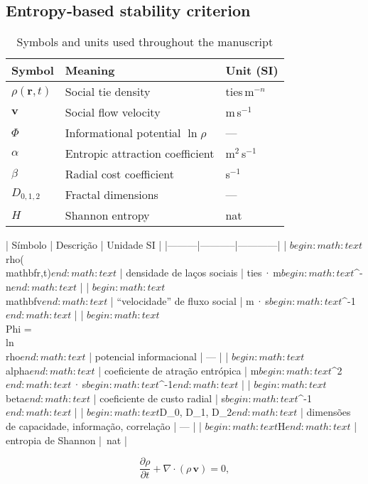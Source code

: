 \subsection{Entropy‑based stability criterion}\label{sec:entropy}
\begin{table}[h]
\caption{Symbols and units used throughout the manuscript}
\centering
\begin{tabular}{lll}
\hline
Symbol & Meaning & Unit (SI)\\\hline
$\rho(\mathbf{r},t)$ & Social tie density & ties\,m$^{-n}$\\
$\mathbf{v}$ & Social flow velocity & m\,s$^{-1}$\\
$\Phi$ & Informational potential $\ln\rho$ & —\\
$\alpha$ & Entropic attraction coefficient & m$^{2}$\,s$^{-1}$\\
$\beta$ & Radial cost coefficient & s$^{-1}$\\
$D_{0,1,2}$ & Fractal dimensions & —\\
$H$ & Shannon entropy & nat\\\hline
\end{tabular}
\label{tab:symbols}
\end{table}

| Símbolo | Descrição | Unidade SI |
|---------|-----------|------------|
| $begin:math:text$\\rho(\\mathbf{r},t)$end:math:text$ | densidade de laços sociais | ties · m$begin:math:text$^{-n}$end:math:text$ |
| $begin:math:text$\\mathbf{v}$end:math:text$ | “velocidade” de fluxo social | m · s$begin:math:text$^{-1}$end:math:text$ |
| $begin:math:text$\\Phi = \\ln \\rho$end:math:text$ | potencial informacional | — |
| $begin:math:text$\\alpha$end:math:text$ | coeficiente de atração entrópica | m$begin:math:text$^2$end:math:text$ · s$begin:math:text$^{-1}$end:math:text$ |
| $begin:math:text$\\beta$end:math:text$ | coeficiente de custo radial | s$begin:math:text$^{-1}$end:math:text$ |
| $begin:math:text$D_0, D_1, D_2$end:math:text$ | dimensões de capacidade, informação, correlação | — |
| $begin:math:text$H$end:math:text$ | entropia de Shannon | nat |

\begin{equation}
\frac{\partial \rho}{\partial t} + \nabla\!\cdot\!(\rho\,\mathbf{v}) = 0 ,
\label{eq:continuity}
\end{equation}

